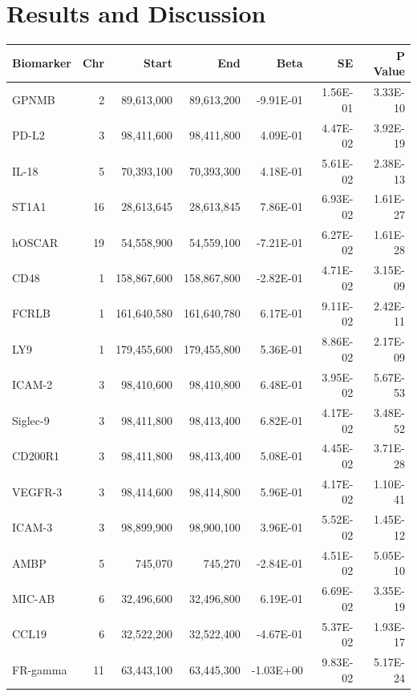 \documentclass[twoside=false]{scrbook}
\begin{document}
\section{Results and Discussion}
\begin{table}[]
    \begin{tabular}{@{}lrrrrrr@{}}
        \toprule
        \textbf{Biomarker} & \textbf{Chr} & \textbf{Start} & \textbf{End} & \textbf{Beta} & \textbf{SE} & \textbf{P Value} \\
        \midrule
        GPNMB    & 2  & 89,613,000  & 89,613,200  & -9.91E-01 & 1.56E-01 & 3.33E-10 \\
        PD-L2    & 3  & 98,411,600  & 98,411,800  & 4.09E-01  & 4.47E-02 & 3.92E-19 \\
        IL-18    & 5  & 70,393,100  & 70,393,300  & 4.18E-01  & 5.61E-02 & 2.38E-13 \\
        ST1A1    & 16 & 28,613,645  & 28,613,845  & 7.86E-01  & 6.93E-02 & 1.61E-27 \\
        hOSCAR   & 19 & 54,558,900  & 54,559,100  & -7.21E-01 & 6.27E-02 & 1.61E-28 \\
        \midrule
        CD48     & 1  & 158,867,600 & 158,867,800 & -2.82E-01 & 4.71E-02 & 3.15E-09 \\
        FCRLB    & 1  & 161,640,580 & 161,640,780 & 6.17E-01  & 9.11E-02 & 2.42E-11 \\
        LY9      & 1  & 179,455,600 & 179,455,800 & 5.36E-01  & 8.86E-02 & 2.17E-09 \\
        ICAM-2   & 3  & 98,410,600  & 98,410,800  & 6.48E-01  & 3.95E-02 & 5.67E-53 \\
        Siglec-9 & 3  & 98,411,800  & 98,413,400  & 6.82E-01  & 4.17E-02 & 3.48E-52 \\
        CD200R1  & 3  & 98,411,800  & 98,413,400  & 5.08E-01  & 4.45E-02 & 3.71E-28 \\
        VEGFR-3  & 3  & 98,414,600  & 98,414,800  & 5.96E-01  & 4.17E-02 & 1.10E-41 \\
        ICAM-3   & 3  & 98,899,900  & 98,900,100  & 3.96E-01  & 5.52E-02 & 1.45E-12 \\
        AMBP     & 5  & 745,070     & 745,270     & -2.84E-01 & 4.51E-02 & 5.05E-10 \\
        MIC-AB   & 6  & 32,496,600  & 32,496,800  & 6.19E-01  & 6.69E-02 & 3.35E-19 \\
        CCL19    & 6  & 32,522,200  & 32,522,400  & -4.67E-01 & 5.37E-02 & 1.93E-17 \\
        FR-gamma & 11 & 63,443,100  & 63,445,300  & -1.03E+00 & 9.83E-02 & 5.17E-24 \\

\end{tabular}
\end{table}
\end{document}
